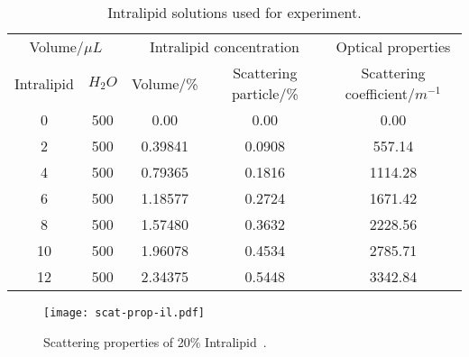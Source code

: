 \begin{table}[!ht]
    \begin{tabular}{cc|cc|c}
        \hline
        \multicolumn{2}{c|}{Volume/$\mu L$} & \multicolumn{2}{c|}{Intralipid concentration}                       & Optical properties              \\
        Intralipid                & $H_2O$  & Volume/\%      & Scattering particle/\%                             & Scattering coefficient/$m^{-1}$ \\ \hline
        \multicolumn{1}{c|}{0}    & 500     & \multicolumn{1}{c|}{0.00}    & 0.00                                 & 0.00                            \\
        \multicolumn{1}{c|}{2}    & 500     & \multicolumn{1}{c|}{0.39841} & 0.0908                               & 557.14                          \\
        \multicolumn{1}{c|}{4}    & 500     & \multicolumn{1}{c|}{0.79365} & 0.1816                               & 1114.28                         \\
        \multicolumn{1}{c|}{6}    & 500     & \multicolumn{1}{c|}{1.18577} & 0.2724                               & 1671.42                         \\
        \multicolumn{1}{c|}{8}    & 500     & \multicolumn{1}{c|}{1.57480} & 0.3632                               & 2228.56                         \\
        \multicolumn{1}{c|}{10}   & 500     & \multicolumn{1}{c|}{1.96078} & 0.4534                               & 2785.71                         \\
        \multicolumn{1}{c|}{12}   & 500     & \multicolumn{1}{c|}{2.34375} & 0.5448                               & 3342.84                         \\ \hline
    \end{tabular}
    \caption{Intralipid solutions used for experiment.}
    \label{tab:intra}
\end{table}

\begin{figure}[!ht]
    \centering
    \texttt{[image: scat-prop-il.pdf]}
    \caption{Scattering properties of 20\% Intralipid~\cite{michels2008optical}.}
    \label{fig:ilscatprop}
    \vspace{-10pt}
\end{figure}


